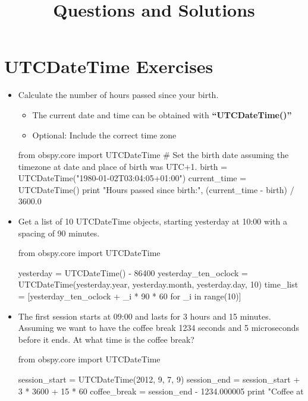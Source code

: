 \documentclass[10pt]{article}
\title{Questions and Solutions}
\date{}
\begin{document}
  \maketitle


\section*{UTCDateTime Exercises}

\begin{itemize}
\item Calculate the number of hours passed since your birth. \\
    \begin{itemize}
        \item The current date and time can be obtained with \textbf{``UTCDateTime()''}
        \item Optional: Include the correct time zone
    \end{itemize}


\begin{python}
from obspy.core import UTCDateTime
# Set the birth date assuming the timezone at date and place of birth was UTC+1.
birth = UTCDateTime("1980-01-02T03:04:05+01:00")
current_time = UTCDateTime()
print "Hours passed since birth:", (current_time - birth) / 3600.0
\end{python}



\item Get a list of 10 UTCDateTime objects, starting yesterday at 10:00 with a spacing of 90 minutes.

\begin{python}
from obspy.core import UTCDateTime

yesterday = UTCDateTime() - 86400
yesterday_ten_oclock = UTCDateTime(yesterday.year, yesterday.month, yesterday.day, 10)
time_list = [yesterday_ten_oclock + _i * 90 * 60 for _i in range(10)]
\end{python}



\item The first session starts at 09:00 and lasts for 3 hours and 15
    minutes. Assuming we want to have the coffee break 1234 seconds and
    5 microseconds before it ends. At what time is the coffee break?

\begin{python}
from obspy.core import UTCDateTime

session_start = UTCDateTime(2012, 9, 7, 9)
session_end = session_start + 3 * 3600 + 15 * 60
coffee_break = session_end - 1234.000005
print "Coffee at %
\end{python}





\end{itemize}
\end{document}
